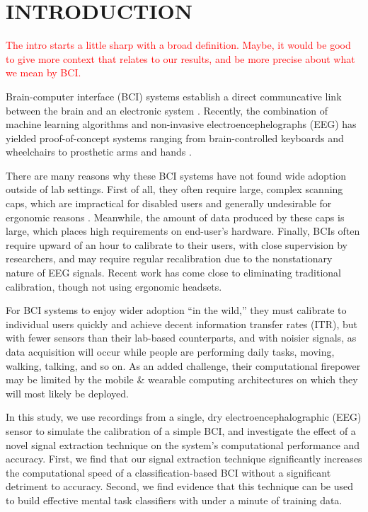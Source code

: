 \section{\uppercase{Introduction}}
\label{sec:introduction}

\textcolor{red}{The intro starts a little sharp with a broad definition. Maybe, it would be good to give more context that relates to our results, and be more precise about what we mean by BCI.}

\noindent Brain-computer interface (BCI) systems establish a direct communcative link between the brain and an electronic system \cite{dornhege_toward_2007,mcfarland_brain-computer_2011}.  Recently, the combination of machine learning algorithms and non-invasive electroencephelographs (EEG) has yielded proof-of-concept systems ranging from brain-controlled keyboards and wheelchairs to prosthetic arms and hands \cite{blankertz_note_2007,millan_combining_2010,d._mattia_brain_2011,hill_practical_2014,campbell_neurophone:_2010}. 

There are many reasons why these BCI systems have not found wide adoption outside of lab settings. First of all, they often require large, complex scanning caps, which are impractical for disabled users and generally undesirable for ergonomic reasons \cite{ekandem_evaluating_2012,leeb_transferring_2013}. Meanwhile, the amount of data produced by these caps is large, which places high requirements on end-user's hardware. Finally, BCIs often require upward of an hour to calibrate to their users, with close supervision by researchers, and may require regular recalibration due to the nonstationary nature of EEG signals. \cite{vidaurre_fully_2006,vidaurre_co-adaptive_2011,blankertz_non-invasive_2007} Recent work has come close to eliminating traditional calibration, though not using ergonomic headsets. 

For BCI systems to enjoy wider adoption ``in the wild,'' they must calibrate to individual users quickly and achieve decent information transfer rates (ITR), but with fewer sensors than their lab-based counterparts, and with noisier signals, as data acquisition will occur while people are performing daily tasks, moving, walking, talking, and so on. As an added challenge, their computational firepower may be limited by the mobile \& wearable computing architectures on which they will most likely be deployed. 

In this study, we use recordings from a single, dry electroencephalographic (EEG) sensor to simulate the calibration of a simple BCI, and investigate the effect of a novel signal extraction technique on the system’s computational performance and accuracy. First, we find that our signal extraction technique significantly increases the computational speed of a classification-based BCI without a significant detriment to accuracy. Second, we find evidence that this technique can be used to build effective mental task classifiers with under a minute of training data.